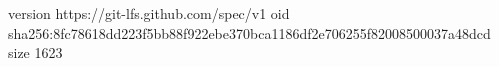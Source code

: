 version https://git-lfs.github.com/spec/v1
oid sha256:8fc78618dd223f5bb88f922ebe370bca1186df2e706255f82008500037a48dcd
size 1623
